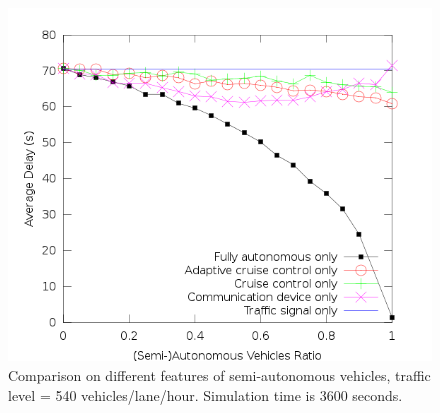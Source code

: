 \begin{figure}
\centering
\includegraphics[width=0.8\columnwidth]{figures/figure_5.png}
\caption{Comparison on different features of semi-autonomous vehicles,
traffic level = 540 vehicles/lane/hour. Simulation time is 3600 seconds.}
\label{fig:figure5}
\end{figure}





